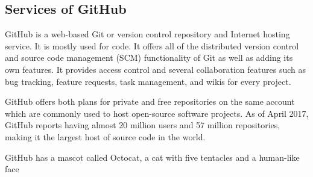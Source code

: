 \documentclass[12pt]{article}
\begin{document}
\subsection{Services of GitHub}
\par GitHub is a web-based Git or version control repository and Internet hosting service. It is mostly used for code. It offers all of the distributed version control and source code management (SCM) functionality of Git as well as adding its own features. It provides access control and several collaboration features such as bug tracking, feature requests, task management, and wikis for every project.

\par GitHub offers both plans for private and free repositories on the same account which are commonly used to host open-source software projects. As of April 2017, GitHub reports having almost 20 million users and 57 million repositories, making it the largest host of source code in the world.

\par GitHub has a mascot called Octocat, a cat with five tentacles and a human-like face
\end{document}
